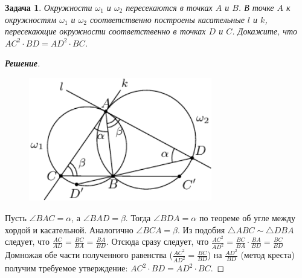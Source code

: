 \documentclass[14pt]{extarticle}
\newtheorem*{lemma}{\textup{Задача}}
\begin{document}
\begin{lemma}
	\textup{
	Окружности $\omega_1$ и $\omega_2$ пересекаются
	в точках $A$ и $B$. В точке $A$ к окружностям $\omega_1$
	и $\omega_2$ соответственно
	построены касательные $l$ и $k$, пересекающие окружности
	соответственно в точках $D$ и $C$.
	Докажите, что $AC^2 \cdot BD = AD^2 \cdot BC$.
    }
\end{lemma}

\begin{proof}[\bf{\textup{Решение}}]
	
	\begin{figure}[H]
	\centering
	\includegraphics[width=8cm]{./img/img.pdf}
    \end{figure}
    

    Пусть $\angle BAC = \alpha$, а $\angle BAD = \beta$. 
	Тогда $\angle BDA = \alpha$ по теореме об угле между
	хордой и касательной. Аналогично $\angle BCA = \beta$.
	Из подобия $ \bigtriangleup ABC \sim  \bigtriangleup DBA $
	следует, что $\frac{AC}{AD} = \frac{BC}{BA} = \frac{BA}{BD}$.
	Отсюда сразу следует, что $\frac{AC^2}{AD^2} = 
	\frac{BC}{BA} \cdot \frac{BA}{BD} = \frac{BC}{BD}$
	Домножая обе части полученного равенства ($\frac{AC^2}{AD^2} = 
	\frac{BC}{BD}$) на $\frac{AD^2}{BD}$ (метод креста)
	получим требуемое утверждение: $AC^2 \cdot BD = AD^2 \cdot BC$.
\end{proof}
\end{document}
